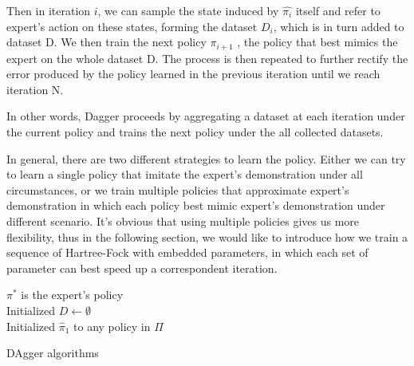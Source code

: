 \documentclass[twoside]{article}
\begin{document}
Then in iteration $i$, we can sample the state induced by $\hat{\pi_i}$ itself and refer to expert's action on these states, forming the dataset $D_i$, which is in turn added to dataset D. We then train the next policy $\hat{\pi_{i+1}}$ , the policy that best mimics the expert on the whole dataset D. The process is then repeated to further rectify the error produced by the policy learned in the previous iteration until we reach iteration N.

In other words, Dagger proceeds by aggregating a dataset
at each iteration under the current policy and trains the next policy under the all collected datasets. 


In general, there are two different strategies to learn the policy. Either we can try to learn a single policy that imitate the expert's demonstration under all circumstances, or we train multiple policies that approximate expert's demonstration in which each policy best mimic expert's demonstration under different scenario.
It's obvious that using multiple policies gives us more flexibility, thus in the following section, we would like to introduce how we train a sequence of Hartree-Fock with embedded parameters, in which each set of parameter can best speed up a correspondent iteration.








\begin{algorithm}[htb]
 \KwData{ }
 $\pi^*$  is the expert’s policy \\
 Initialized $D \leftarrow \emptyset$ \\
 Initialized $\hat{\pi}_1$ to any policy in $\Pi$ \\
 \caption{DAgger algorithms}
\end{algorithm}
\end{document}
